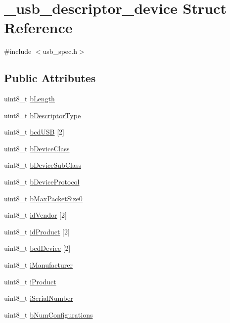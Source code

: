 \hypertarget{struct__usb__descriptor__device}{\section{\-\_\-usb\-\_\-descriptor\-\_\-device Struct Reference}
\label{struct__usb__descriptor__device}
}


{\ttfamily \#include $<$usb\-\_\-spec.\-h$>$}

\subsection*{Public Attributes}
\begin{DoxyCompactItemize}
\item 
uint8\-\_\-t \hyperlink{struct__usb__descriptor__device_aeb95ab591790aae03b5724f61bc6b8bf}{b\-Length}
\item 
uint8\-\_\-t \hyperlink{struct__usb__descriptor__device_a9fb8dc4b40bfd7da0ff91c6c85e8fd2e}{b\-Descriptor\-Type}
\item 
uint8\-\_\-t \hyperlink{struct__usb__descriptor__device_aac1225049ba93e53c846adf12d28887a}{bcd\-U\-S\-B} \mbox{[}2\mbox{]}
\item 
uint8\-\_\-t \hyperlink{struct__usb__descriptor__device_ae54358fbafc01261ed9c9b683726e73d}{b\-Device\-Class}
\item 
uint8\-\_\-t \hyperlink{struct__usb__descriptor__device_ada8a36a11e797622a579b5fc6eaefda0}{b\-Device\-Sub\-Class}
\item 
uint8\-\_\-t \hyperlink{struct__usb__descriptor__device_ab67c3ea21533bfa8260f2f466fa77e7f}{b\-Device\-Protocol}
\item 
uint8\-\_\-t \hyperlink{struct__usb__descriptor__device_a73c95a496c680b3a09fd067cf7af065f}{b\-Max\-Packet\-Size0}
\item 
uint8\-\_\-t \hyperlink{struct__usb__descriptor__device_a3f9882917cf081f5fc719976261fe967}{id\-Vendor} \mbox{[}2\mbox{]}
\item 
uint8\-\_\-t \hyperlink{struct__usb__descriptor__device_a2467ace6e29c362621be06b3b4b45e27}{id\-Product} \mbox{[}2\mbox{]}
\item 
uint8\-\_\-t \hyperlink{struct__usb__descriptor__device_a3217d467724373cba76f9a1906fe32a9}{bcd\-Device} \mbox{[}2\mbox{]}
\item 
uint8\-\_\-t \hyperlink{struct__usb__descriptor__device_a283a9b1246f91d6fb4b04aaf425a0182}{i\-Manufacturer}
\item 
uint8\-\_\-t \hyperlink{struct__usb__descriptor__device_a1edb8eb3bf1bfe19a9125a1b94c03e2e}{i\-Product}
\item 
uint8\-\_\-t \hyperlink{struct__usb__descriptor__device_acc5f539a5344be6787f56cbebc3b910f}{i\-Serial\-Number}
\item 
uint8\-\_\-t \hyperlink{struct__usb__descriptor__device_ac7c81e83989a8866ecb8c066fbbaf558}{b\-Num\-Configurations}
\end{DoxyCompactItemize}


